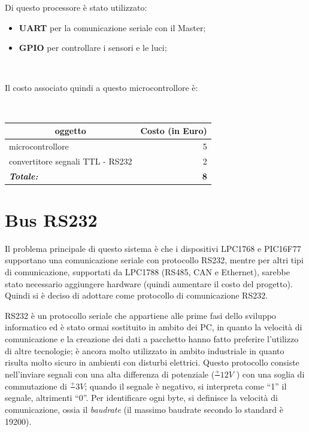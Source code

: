 \documentclass[a4paper,titlepage]{book}
\newcommand{\itema}{\begin{itemize}[noitemsep,topsep=10pt,parsep=5pt,partopsep=10pt]}
\begin{document}
Di questo processore è stato utilizzato:

\itema

\item \textbf{UART} per la comunicazione seriale con il Master;
\item \textbf{GPIO} per controllare i sensori e le luci;
\end{itemize}
 
~

Il costo associato quindi a questo microcontrollore è:

~

\begin{tabular}{|l  r|}
\hline
\multicolumn{1}{|c|}{\textbf {oggetto}} & \multicolumn{1}{c|}{\textbf {Costo (in Euro)}} \\
\hline

microcontrollore			& 5 \\
convertitore segnali TTL - RS232 	& 2  \\
\hline
\hline

\textit{\textbf{Totale:}}		& \textbf{8} \\

\hline
\end{tabular}

\section{Bus RS232}



Il problema principale di questo sistema è che i dispositivi LPC1768 e PIC16F77 supportano una comunicazione seriale con protocollo RS232, mentre per altri tipi di comunicazione, supportati da LPC1788 (RS485, CAN e Ethernet), sarebbe stato necessario aggiungere hardware (quindi aumentare il costo del progetto). Quindi si è deciso di adottare come protocollo di comunicazione RS232.

RS232 è un protocollo seriale che appartiene alle prime fasi dello sviluppo informatico ed è stato ormai sostituito in ambito dei PC, in quanto la velocità di comunicazione e la creazione dei dati a pacchetto hanno fatto preferire l'utilizzo di altre tecnologie; è ancora molto utilizzato in ambito industriale in quanto risulta molto sicuro in ambienti con disturbi elettrici. Questo protocollo consiste nell'inviare segnali con una alta differenza di potenziale ($ \frac{+}{}12V $ ) con una soglia di commutazione di $\frac{+}{} 3V $; quando il segnale è negativo, si interpreta come ``1'' il segnale, altrimenti ``0''. Per identificare ogni byte, si definisce la velocità di comunicazione, ossia il \textit{baudrate} (il massimo baudrate secondo lo standard è 19200).
\end{document}
